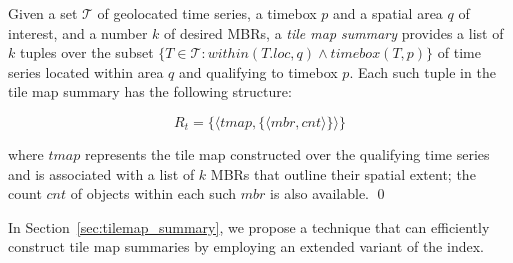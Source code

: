 \begin{problem} 
Given a set $\mathcal{T}$ of geolocated time series, a timebox $p$ and a spatial area $q$ of interest, and a number $k$ of desired MBRs, a {\em tile map summary} provides a list of $k$ tuples over the subset $\{ T \in \mathcal{T} : within(T.loc, q) \wedge timebox(T, p) \}$ of time series located within area $q$ and qualifying to timebox $p$. Each such tuple in the tile map summary has the following structure:

\begin{equation} \label{eq:tmap_sum}
R_t = \{ \langle tmap, \{\langle mbr, cnt \rangle \}\rangle\}
\end{equation}

\noindent where $tmap$ represents the tile map constructed over the qualifying time series and is associated with a list of $k$ MBRs that outline their spatial extent; the count $cnt$ of objects within each such $mbr$ is also available.
\qed
\end{problem}

In Section~\ref{sec:tilemap_summary}, we propose a technique that can efficiently construct tile map summaries by employing an extended variant of the \isax index.